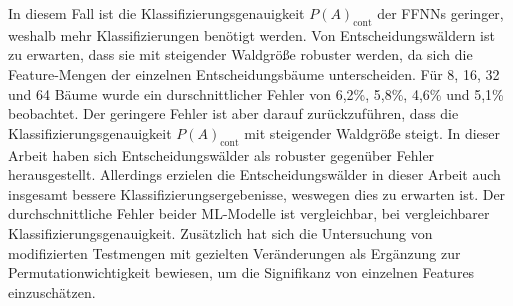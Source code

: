 In diesem Fall ist die Klassifizierungsgenauigkeit $P(A)_{\text{cont}}$ der FFNNs geringer, weshalb mehr Klassifizierungen benötigt werden.
\newline
\newline
Von Entscheidungswäldern ist zu erwarten, dass sie mit steigender Waldgröße robuster werden, da sich die Feature-Mengen der einzelnen Entscheidungsbäume unterscheiden.
Für 8, 16, 32 und 64 Bäume wurde ein durschnittlicher Fehler von 6,2\%, 5,8\%, 4,6\% und 5,1\% beobachtet.
Der geringere Fehler ist aber darauf zurückzuführen, dass die Klassifizierungsgenauigkeit $P(A)_{\text{cont}}$ mit steigender Waldgröße steigt.
\newline
\newline
In dieser Arbeit haben sich Entscheidungswälder als robuster gegenüber Fehler herausgestellt.
Allerdings erzielen die Entscheidungswälder in dieser Arbeit auch insgesamt bessere Klassifizierungsergebenisse, weswegen dies zu erwarten ist.
Der durchschnittliche Fehler beider ML-Modelle ist vergleichbar, bei vergleichbarer Klassifizierungsgenauigkeit.
Zusätzlich hat sich die Untersuchung von modifizierten Testmengen mit gezielten Veränderungen als Ergänzung zur Permutationwichtigkeit bewiesen,
um die Signifikanz von einzelnen Features einzuschätzen.